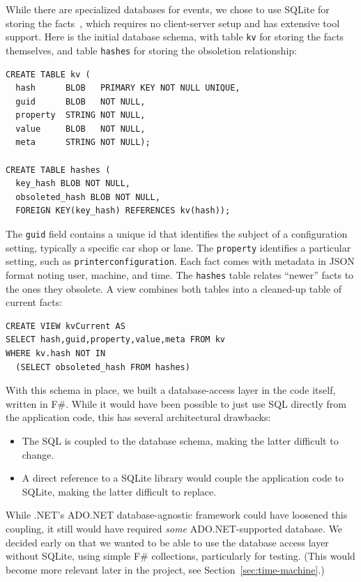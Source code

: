 \documentclass[sigplan,review]{acmart}
\begin{document}
While there are specialized databases for events, we chose to use
SQLite for storing the facts~\cite{SQLite}, which requires no
client-server setup and has extensive tool support.  Here
is the initial database schema, with table \texttt{kv} for storing the
facts themselves, and table \texttt{hashes} for storing the obsoletion relationship:
%
\begin{verbatim}
CREATE TABLE kv (
  hash      BLOB   PRIMARY KEY NOT NULL UNIQUE,
  guid      BLOB   NOT NULL,
  property  STRING NOT NULL,
  value     BLOB   NOT NULL,
  meta      STRING NOT NULL);

CREATE TABLE hashes (
  key_hash BLOB NOT NULL,
  obsoleted_hash BLOB NOT NULL,
  FOREIGN KEY(key_hash) REFERENCES kv(hash));
\end{verbatim}
%
The \texttt{guid} field contains a unique id that identifies the subject of
a configuration setting, typically a specific car shop or lane.  The
\texttt{property} identifies a particular setting, such as
\texttt{printerconfiguration}.  Each fact comes with
metadata in JSON format noting user, machine, and time.
The \texttt{hashes} table relates ``newer'' facts to the ones they
obsolete. A view combines both tables into a cleaned-up table of
current facts:
%
\begin{verbatim}
CREATE VIEW kvCurrent AS
SELECT hash,guid,property,value,meta FROM kv
WHERE kv.hash NOT IN
  (SELECT obsoleted_hash FROM hashes)
\end{verbatim}
%
With this schema in place, we built a database-access layer in the
code itself, written in F\#.  While it would have been possible to
just use SQL directly from the application
code, this has several architectural drawbacks:
%
\begin{itemize}
\item The SQL is coupled to
  the database schema, making the latter difficult to change.
\item A direct reference to a SQLite library would couple the
  application code to SQLite, making the latter difficult to
  replace. 
\end{itemize}
%
While .NET's ADO.NET database-agnostic framework could have loosened
this coupling, it still would have required \emph{some}
ADO.NET-supported database. We decided early on that we wanted to be
able to use the database access layer without SQLite, using simple F\#
collections, particularly for testing.  (This would become more relevant
later in the project, see Section~\ref{sec:time-machine}.)
\end{document}
